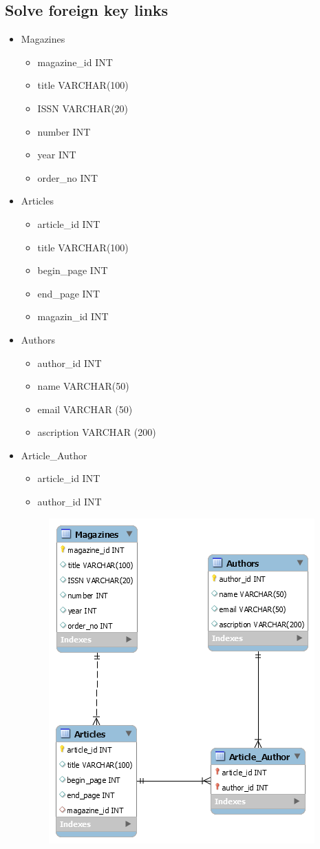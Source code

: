 \documentclass{article}
\begin{document}
\subsection{Solve foreign key links}
\begin{itemize}
	\item Magazines 
	\begin{itemize}
	\item magazine\_id INT
	\item title VARCHAR(100)
	\item ISSN VARCHAR(20)
	\item number INT
	\item year INT
	\item order\_no INT
	\end{itemize}
	\item Articles 
	\begin{itemize}
	\item article\_id INT
	\item title VARCHAR(100)
	\item begin\_page INT
	\item end\_page INT
	\item magazin\_id INT
	\end{itemize} 
	\item Authors 
	\begin{itemize}
	\item author\_id INT
	\item name VARCHAR(50)
	\item email VARCHAR (50)
	\item ascription VARCHAR (200)
	\end{itemize}
	\item Article\_Author
	\begin{itemize}
	\item article\_id INT
	\item author\_id INT
	\end{itemize}	 
\begin{figure}[h]
\centering
\includegraphics[scale = 0.7]{4.PNG}

\end{figure}
\end{itemize}
\end{document}
